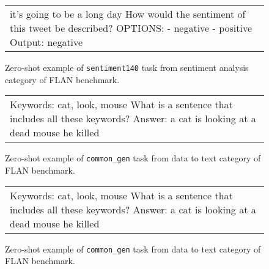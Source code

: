 \begin{figure}[h]
\centering
\begin{tabular}{p{}}
\cellcolor{oldlace} it's going to be a long day \vspace{1pt} \newline \vspace{1pt} \newline How would the sentiment of this tweet be described?\vspace{1pt} \newline OPTIONS:\vspace{1pt} \newline - negative\vspace{1pt} \newline - positive\vspace{1pt} \newline Output: \textcolor{cadmiumgreen}{negative} \\
\end{tabular}
\caption{Zero-shot example of \texttt{sentiment140} task from sentiment analysis category of FLAN benchmark.}
\end{figure}




\begin{figure}[h]
\centering
\begin{tabular}{p{}}
\cellcolor{oldlace} Keywords: cat, look, mouse\vspace{1pt} \newline \vspace{1pt} \newline What is a sentence that includes all these keywords?\vspace{1pt} \newline Answer: \textcolor{cadmiumgreen}{a cat is looking at a dead mouse he killed} \\
\end{tabular}
\caption{Zero-shot example of \texttt{common\_gen} task from data to text category of FLAN benchmark.}
\end{figure}




\begin{figure}[h]
\centering
\begin{tabular}{p{}}
\cellcolor{oldlace} Keywords: cat, look, mouse\vspace{1pt} \newline \vspace{1pt} \newline What is a sentence that includes all these keywords?\vspace{1pt} \newline Answer: \textcolor{cadmiumgreen}{a cat is looking at a dead mouse he killed} \\
\end{tabular}
\caption{Zero-shot example of \texttt{common\_gen} task from data to text category of FLAN benchmark.}
\end{figure}




